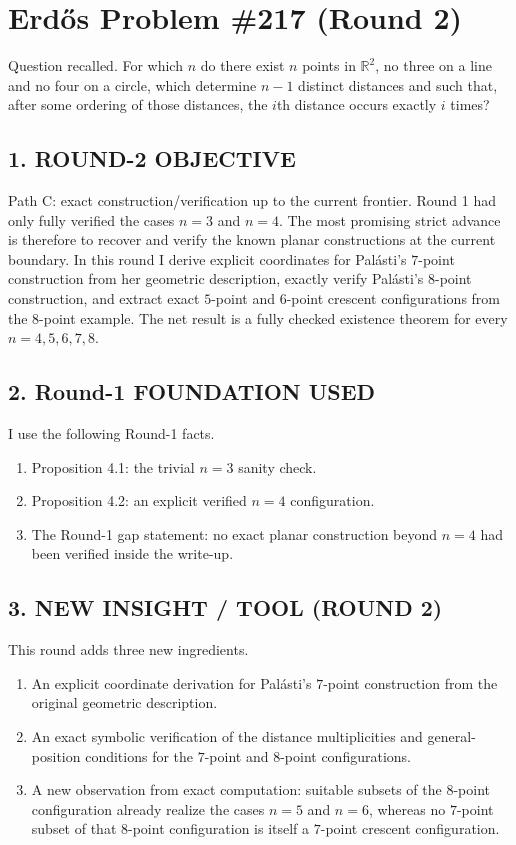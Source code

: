 \section*{Erd\H{o}s Problem \#217 (Round 2)}

Question recalled. For which $n$ do there exist $n$ points in $\mathbb{R}^2$, no three on a line and no four on a circle, which determine $n-1$ distinct distances and such that, after some ordering of those distances, the $i$th distance occurs exactly $i$ times?

\subsection*{1. ROUND-2 OBJECTIVE}
Path C: exact construction/verification up to the current frontier. Round 1 had only fully verified the cases $n=3$ and $n=4$. The most promising strict advance is therefore to recover and verify the known planar constructions at the current boundary. In this round I derive explicit coordinates for Pal\'asti's $7$-point construction from her geometric description, exactly verify Pal\'asti's $8$-point construction, and extract exact $5$-point and $6$-point crescent configurations from the $8$-point example. The net result is a fully checked existence theorem for every $n=4,5,6,7,8$.

\subsection*{2. Round-1 FOUNDATION USED}
I use the following Round-1 facts.
\begin{enumerate}
\item Proposition 4.1: the trivial $n=3$ sanity check.
\item Proposition 4.2: an explicit verified $n=4$ configuration.
\item The Round-1 gap statement: no exact planar construction beyond $n=4$ had been verified inside the write-up.
\end{enumerate}

\subsection*{3. NEW INSIGHT / TOOL (ROUND 2)}
This round adds three new ingredients.
\begin{enumerate}
\item An explicit coordinate derivation for Pal\'asti's $7$-point construction from the original geometric description.
\item An exact symbolic verification of the distance multiplicities and general-position conditions for the $7$-point and $8$-point configurations.
\item A new observation from exact computation: suitable subsets of the $8$-point configuration already realize the cases $n=5$ and $n=6$, whereas no $7$-point subset of that $8$-point configuration is itself a $7$-point crescent configuration.
\end{enumerate}

